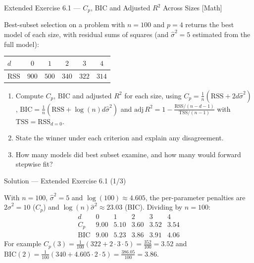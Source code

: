 \documentclass[aspectratio=169,11pt]{beamer}
\begin{document}
\begin{frame}{Extended Exercise 6.1 --- $C_p$, BIC and Adjusted $R^2$ Across Sizes [Math]}
  \begin{longexercise}
    Best-subset selection on a problem with $n=100$ and $p=4$ returns the
    best model of each size, with residual sums of squares (and
    $\hat\sigma^2=5$ estimated from the full model):
    \begin{center}\footnotesize
      \begin{tabular}{lccccc}
        \toprule
        $d$ & $0$ & $1$ & $2$ & $3$ & $4$ \\
        \midrule
        RSS & $900$ & $500$ & $340$ & $322$ & $314$ \\
        \bottomrule
      \end{tabular}
    \end{center}
    \begin{enumerate}
      \item Compute $C_p$, BIC and adjusted $R^2$ for each size, using
            $C_p=\tfrac1n(\mathrm{RSS}+2d\hat\sigma^2)$,
            $\mathrm{BIC}=\tfrac1n(\mathrm{RSS}+\log(n)d\hat\sigma^2)$ and
            $\mathrm{adj}\,R^2=1-\tfrac{\mathrm{RSS}/(n-d-1)}
            {\mathrm{TSS}/(n-1)}$ with $\mathrm{TSS}=\mathrm{RSS}_{d=0}$.
      \item State the winner under each criterion and explain any
            disagreement.
      \item How many models did best subset examine, and how many would
            forward stepwise fit?
    \end{enumerate}
  \end{longexercise}
\end{frame}

\begin{frame}{Solution --- Extended Exercise 6.1 (1/3)}
  \begin{solutionbox}
    With $n=100$, $\hat\sigma^2=5$ and $\log(100)\approx4.605$, the
    per-parameter penalties are $2\hat\sigma^2=10$ ($C_p$) and
    $\log(n)\hat\sigma^2\approx23.03$ (BIC). Dividing by $n=100$:
    \[
      \begin{array}{c|ccccc}
        d & 0 & 1 & 2 & 3 & 4\\\hline
        C_p          & 9.00 & 5.10 & 3.60 & \mathbf{3.52} & 3.54\\[1pt]
        \mathrm{BIC} & 9.00 & 5.23 & \mathbf{3.86} & 3.91 & 4.06
      \end{array}
    \]
    For example $C_p(3)=\tfrac1{100}(322+2\cdot3\cdot5)=\tfrac{352}{100}
    =3.52$ and $\mathrm{BIC}(2)=\tfrac1{100}(340+4.605\cdot2\cdot5)
    =\tfrac{386.05}{100}=3.86$.
  \end{solutionbox}
\end{frame}
\end{document}
